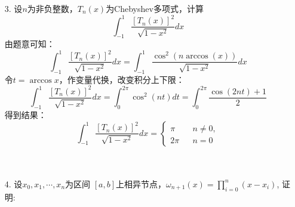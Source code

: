 \documentclass{article}
\begin{document}
\begin{itemize}
		\item[3.]设$n$为非负整数，$T_{n}(x)$为Chebyshev多项式，计算
		$$
			\int_{-1}^{1} \frac{[T_{n}(x)]^2}{\sqrt{1 - x^2}}dx
		$$
		由题意可知：
		$$
		\int_{-1}^{1} \frac{[T_{n}(x)]^2}{\sqrt{1 - x^2}}dx = \int_{-1}^{1}\frac{\cos^2(n \arccos(x))}{\sqrt{1 - x^2}}dx 
		$$
		令$t = \arccos x$，作变量代换，改变积分上下限：
		$$
		\int_{-1}^{1} \frac{[T_{n}(x)]^2}{\sqrt{1 - x^2}}dx = \int_{0}^{2\pi}\cos^2(nt)dt = \int_{0}^{2\pi}\frac{\cos(2nt) + 1}{2}
		$$
		得到结果：
		$$
		\int_{-1}^{1} \frac{[T_{n}(x)]^2}{\sqrt{1 - x^2}}dx = \left\{
		\begin{array}{lcl}
		\pi && n \ne 0,\\
		2\pi && n = 0
		\end{array}
		\right.
		$$\\\\
		\item[4.]设$x_{0}, x_{1}, \cdots, x_{n}$为区间 $[a, b]$上相异节点，$ω_{n+1}(x) = \prod_{i = 0}^{n}(x − x_{i})$, 证明:


\end{itemize}
\end{document}
